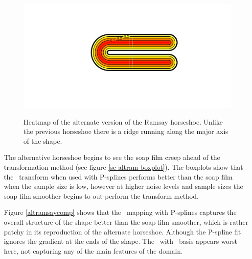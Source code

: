 \begin{figure}
\centering
\includegraphics[trim=0.5in 1in 0in 0.5in]{sc/figs/altramsayhorseshoe.pdf} \\
\caption{Heatmap of the alternate version of the Ramsay horseshoe. Unlike the previous horseshoe there is a ridge running along the major axis of the shape.}
\label{altramsayhorseshoe}
\end{figure}

The alternative horseshoe begins to see the soap film creep ahead of the transformation method (see figure \ref{sc-altram-boxplot}). The boxplots show that the \sch\ transform when used with P-splines performs better than the soap film when the sample size is low, however at higher noise levels and sample sizes the soap film smoother begins to out-perform the transform method.

Figure \ref{altramsaycomp} shows that the \sch\ mapping with P-splines captures the overall structure of the shape better than the soap film smoother, which is rather patchy in its reproduction of the alternate horseshoe. Although the P-spline fit ignores the gradient at the ends of the shape. The \sch\ with \tprs\ basis appears worst here, not capturing any of the main features of the domain.

